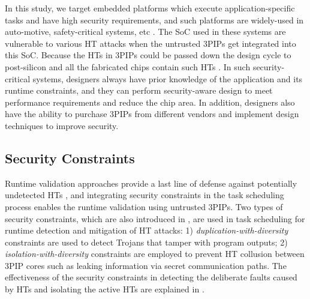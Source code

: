 \documentclass[10pt,journal, compsoc]{IEEEtran}
\begin{document}
In this study, we target embedded platforms which execute application-specific tasks and have high security requirements, and such platforms are widely-used in auto-motive, safety-critical systems, etc \cite{article:YS}. The SoC used in these systems are vulnerable to various HT attacks when the untrusted 3PIPs get integrated into this SoC. Because the HTs in 3PIPs could be passed down the design cycle to post-silicon and all the fabricated chips contain such HTs \cite{article:NP}. In such security-critical systems, designers always have prior knowledge of the application and its runtime constraints, and they can perform security-aware design to meet performance requirements and reduce the chip area. In addition, designers also have the ability to purchase 3PIPs from different vendors and implement design techniques to improve security.

\subsection{Security Constraints}

Runtime validation approaches provide a last line of defense against potentially undetected HTs \cite{article:SB}, and integrating security constraints in the task scheduling process enables the runtime validation using untrusted 3PIPs. Two types of security constraints, which are also introduced in \cite{article:SR, conference:AS, article:YS, article:XC, article:CL, article:NW, conference:NW}, are used in task scheduling for runtime detection and mitigation of HT attacks: 1) \textit{duplication-with-diversity} constraints are used to detect Trojans that tamper with program outputs; 2) \textit{isolation-with-diversity} constraints are employed to prevent HT collusion between 3PIP cores such as leaking information via secret communication paths. The effectiveness of the security constraints in detecting the deliberate faults caused by HTs and isolating the active HTs are explained in \cite{article:JR3}. %
\end{document}

